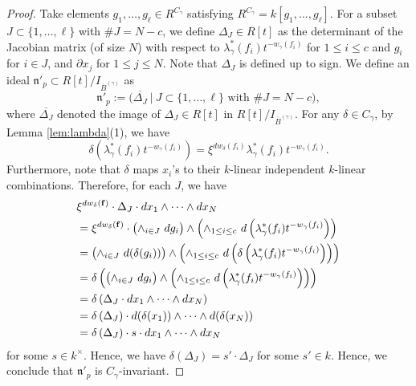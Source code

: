 \documentclass[10pt,a4paper]{amsart}
\begin{document}
\begin{proof}
Take elements $g_1, \ldots , g_{\ell} \in R^{C_{\gamma}}$ satisfying $R^{C_{\gamma}} = k[g_1, \ldots, g_{\ell}]$. 
For a subset $J \subset \{ 1, \ldots, \ell \}$ with $\# J = N-c$, we define $\Delta _J \in R[t]$ as the determinant of the Jacobian matrix (of size $N$) with respect to $\lambda ^* _{\gamma} (f_i) t^{- w_{\gamma}(f_i)}$ for $1 \le i \le c$ and $g_i$ for $i \in J$, and $\partial x_j$ for $1 \le j \le N$. 
Note that $\Delta _J$ is defined up to sign.
We define an ideal $\mathfrak{n}'_{p} \subset R[t] / I_{\overline{B}^{(\gamma)}}$ as 
\[
\mathfrak{n}'_{p} := \bigl ( \overline{ \Delta _J} \ \big| \ \text{$J \subset \{ 1, \ldots, \ell \}$ with $\# J = N-c$} \bigr ), 
\]
where $\overline{ \Delta _J}$ denoted the image of $\Delta _J \in R[t]$ in $R[t] / I_{\overline{B}^{(\gamma)}}$. 
For any $\delta \in C_{\gamma}$, by Lemma \ref{lem:lambda}(1), we have 
\[
\delta \left( \lambda ^* _{\gamma} (f_i) t^{- w_{\gamma}(f_i)} \right) 
= 
\xi^{d w_{\delta} (f_i)} \lambda ^* _{\gamma} (f_i) t^{- w_{\gamma}(f_i)}. 
\]
Furthermore, note that $\delta$ maps $x_i$'s to their $k$-linear independent $k$-linear combinations. 
Therefore, for each $J$, we have 
\begin{align*}
&
\xi^{d w_{\delta} ({\bf f})} \cdot \Delta _J \cdot dx_1 \wedge \cdots \wedge dx_N \\
&=
\xi^{d w_{\delta} ({\bf f})} \cdot 
\bigl( \wedge_{i \in J} \ d g_i \bigr) 
\wedge 
\left( \wedge _{1 \le i \le c}\ d \left( \lambda ^* _{\gamma} (f_i) t^{- w_{\gamma}(f_i)} \right) \right) \\
&=
\bigl( \wedge_{i \in J}\ d (\delta (g_i)) \bigr) 
\wedge 
\left( \wedge _{1 \le i \le c} \ d \left( \delta \left( \lambda ^* _{\gamma} (f_i) t^{- w_{\gamma}(f_i)} \right) \right) \right) \\
&=
\delta \left( 
\bigl( \wedge_{i \in J}\ d g_i \bigr) 
\wedge 
\left( \wedge _{1 \le i \le c} \ d \left( \lambda ^* _{\gamma} (f_i) t^{- w_{\gamma}(f_i)} \right) \right)
\right)\\
&=
\delta \left(
\Delta _J \cdot dx_1 \wedge \cdots \wedge dx_N
\right) \\
&=
\delta \left( \Delta _J \right) 
\cdot d (\delta (x_1)) \wedge \cdots \wedge d (\delta (x_N)) \\
&= 
\delta \left( \Delta _J \right) \cdot s \cdot dx_1 \wedge \cdots \wedge dx_N 
\end{align*}
for some $s \in k^{\times}$. 
Hence, we have $\delta (\Delta _J) = s' \cdot \Delta _J$ for some $s' \in k$. 
Hence, we conclude that $\mathfrak{n}'_{p}$ is $C_{\gamma}$-invariant. 


\end{proof}
\end{document}
